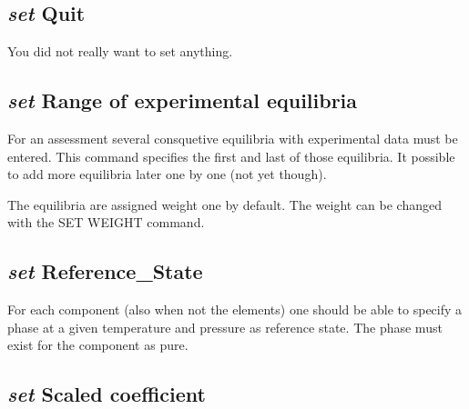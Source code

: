 \documentclass[12pt]{article}
\begin{document}
\subsection{{\em set} Quit}

You did not really want to set anything.

\subsection{{\em set} Range of experimental equilibria}\label{sc:enterrange}

For an assessment several consquetive equilibria with experimental
data must be entered.  This command specifies the first and last of
those equilibria.  It possible to add more equilibria later one by
one (not yet though).  

The equilibria are assigned weight one by default.  The weight can be
changed with the SET WEIGHT command.

\subsection{{\em set} Reference\_State}

For each component (also when not the elements) one should be able to
specify a phase at a given temperature and pressure as reference
state.  The phase must exist for the component as pure.

\subsection{{\em set} Scaled coefficient}
\end{document}
